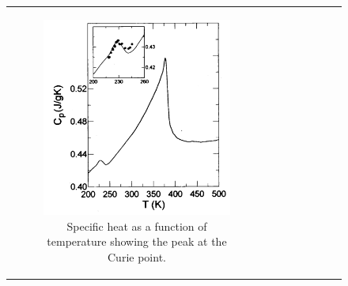\documentclass{article}
\begin{document}
\begin{figure}[H]
    \centering
    \begin{tabular}{cc}
        \begin{subfigure}{0.5\textwidth}
            \centering
            \includegraphics[width=\linewidth]{Images/CuriePoint.png}
            \caption{Specific heat as a function of temperature showing the peak at the Curie point.}
            \label{fig:enter-label}
        \end{subfigure} &
        \begin{subfigure}{0.5\textwidth}
            \centering

\end{subfigure}
\end{tabular}
\end{figure}
\end{document}
